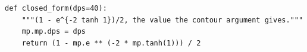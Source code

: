 \begin{verbatim}
def closed_form(dps=40):
    """(1 - e^{-2 tanh 1})/2, the value the contour argument gives."""
    mp.mp.dps = dps
    return (1 - mp.e ** (-2 * mp.tanh(1))) / 2
\end{verbatim}
